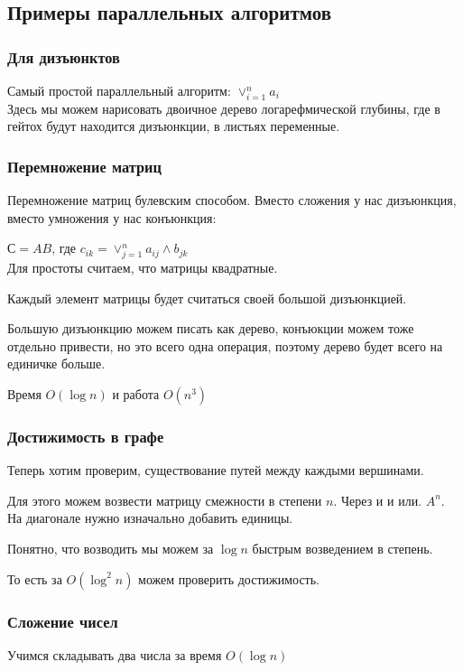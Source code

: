 \subsection{Примеры параллельных алгоритмов}
\subsubsection{Для дизъюнктов}
Самый простой параллельный алгоритм: $\vee_{i = 1}^{n}a_i$\\

Здесь мы можем нарисовать двоичное дерево логарефмической глубины, где в гейтох будут находится дизъюнкции, в листьях переменные.

\subsubsection{Перемножение матриц}
Перемножение матриц булевским способом. Вместо сложения у нас дизъюнкция, вместо умножения у нас конъюнкция:

$С = AB$, где $c_{ik} = \vee_{j = 1}^{n}a_{ij}\wedge b_{jk}$\\

Для простоты считаем, что матрицы квадратные. 

Каждый элемент матрицы будет считаться своей большой дизъюнкцией. 

Большую дизъюнкцию можем писать как дерево, конъюкции можем тоже отдельно привести, но это всего одна операция, поэтому дерево будет 
всего на единичке больше. 

Время $O(\log n)$  и работа $O(n^3)$\\

\subsubsection{Достижимость в графе} 
Теперь хотим проверим, существование путей между каждыми вершинами.

Для этого можем возвести матрицу смежности в степени $n$. Через и и или. $A^n$.\\
На диагонале нужно изначально добавить единицы. 

Понятно, что возводить мы можем за $\log n$ быстрым возведением в степень. 

То есть за $O(\log^2n)$ можем проверить достижимость. 

\subsubsection{Сложение чисел} 
Учимся складывать два числа за время $O(\log n)$\\

